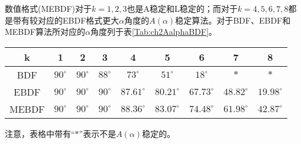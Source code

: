 数值格式(MEBDF)对于$k=1,2,3$也是A稳定和L稳定的；而对于$k=4,5,6,7,8$都是带有较对应的EBDF格式更大$\alpha$角度的$A(\alpha)$稳定算法。对于BDF、EBDF和MEBDF算法所对应的$\alpha$角度列于表\ref{Tab:ch2AalphaBDF}。
\begin{table}[htbp]
\vspace{0.5em}\centering\wuhao
\begin{tabular}{ccccccccc}
\toprule[1.5pt]
k & 1 & 2 & 3 & 4 & 5 & 6 & 7 & 8\\
\midrule[1pt]
BDF & $90^\circ$ & $90^\circ$ & $88^\circ$ & $73^\circ$ & $51^\circ$ & $18^\circ$ & $*$ & $*$\\
EBDF & $90^\circ$ & $90^\circ$ & $90^\circ$ & $87.61^\circ$ & $80.21^\circ$ & $67.73^\circ$ & $48.82^\circ$ & $19.98^\circ$\\
MEBDF & $90^\circ$ & $90^\circ$ & $90^\circ$ & $88.36^\circ$ & $83.07^\circ$ & $74.48^\circ$ & $61.98^\circ$ & $42.87^\circ$\\
\bottomrule[1.5pt]
\end{tabular}
\end{table}
注意，表格中带有“$*$”表示不是$A(\alpha)$稳定的。

